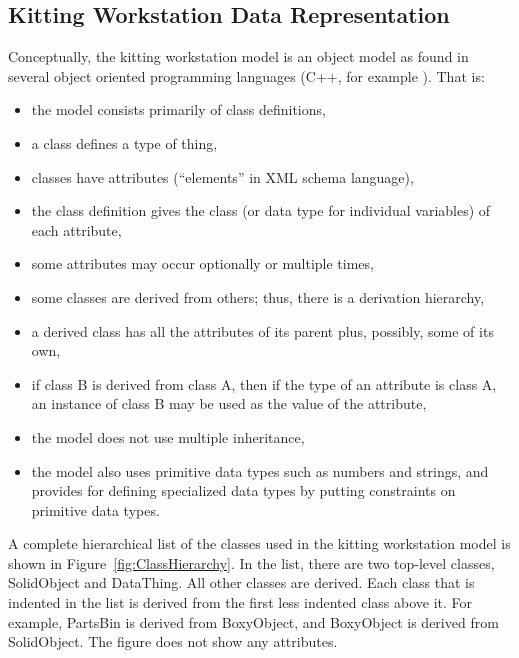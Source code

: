 \subsection{Kitting Workstation Data Representation}
Conceptually, the kitting workstation model is an object model as found in
several object oriented programming languages (C++, for example
\cite{Stroustrup.2000}).  That is:
\begin{itemize}
\item the model consists primarily of class definitions,
\item a class defines a type of thing,
\item classes have attributes (``elements'' in XML schema language),
\item the class definition gives the class (or data type for individual variables) of each attribute,
\item some attributes may occur optionally or multiple times,
\item some classes are derived from others; thus, there is a derivation
 hierarchy,
\item a derived class has all the attributes of its parent plus, possibly,
  some of its own,
\item if class B is derived from class A, then if the type of an attribute
  is class A, an instance of class B may be used as the value of the attribute,
\item the model does not use multiple inheritance,
\item the model also uses primitive data types such as numbers and strings,
  and provides for defining specialized data types by putting constraints
  on primitive data types.
\end{itemize}

A complete hierarchical list of the classes used in the kitting workstation
model is shown in Figure~\ref{fig:ClassHierarchy}. In the list, there are two
top-level classes, SolidObject and DataThing. All other classes are
derived. Each class that is indented in the list is derived from the first
less indented class above it. For example, PartsBin is derived from
BoxyObject, and BoxyObject is derived from SolidObject. The figure does not
show any attributes.

